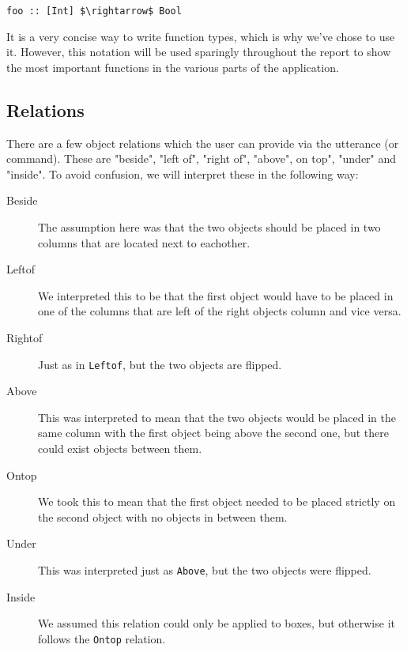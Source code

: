 \begin{lstlisting}
foo :: [Int] $\rightarrow$ Bool
\end{lstlisting}

It is a very concise way to write function types, which is why we've chose to use it. However, this notation will be used sparingly throughout the report to show the most important functions in the various parts of the application.

\subsection*{Relations}
There are a few object relations which the user can provide via the utterance (or command). These are "beside", "left of", "right of", "above", on top", "under" and "inside". To avoid confusion, we will interpret these in the following way:

\begin{description}
  \item[Beside] The assumption here was that the two objects should be placed in
    two columns that are located next to eachother.
  \item[Leftof] We interpreted this to be that the first object would have to be
    placed in one of the columns that are left of the right objects column and
    vice versa.
  \item[Rightof] Just as in \verb|Leftof|, but the two objects are flipped.
  \item[Above] This was interpreted to mean that the two objects would be placed
    in the same column with the first object being above the second one, but
    there could exist objects between them.
  \item[Ontop] We took this to mean that the first object needed to be placed
   strictly on the second object with no objects in between them.
  \item[Under] This was interpreted just as \verb|Above|, but the two objects
    were flipped.
  \item[Inside] We assumed this relation could only be applied to boxes, but
  otherwise it follows the \verb|Ontop| relation.
\end{description}
